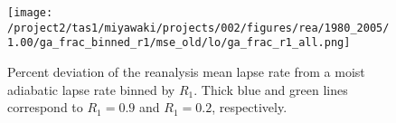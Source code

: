 \documentclass{ametsocV5}
\begin{document}




%

%

\begin{figure}
  \noindent\texttt{[image: /project2/tas1/miyawaki/projects/002/figures/rea/1980\_2005/1.00/ga\_frac\_binned\_r1/mse\_old/lo/ga\_frac\_r1\_all.png]}\\
  \caption{Percent deviation of the reanalysis mean lapse rate from a moist adiabatic lapse rate binned by $R_{1}$. Thick blue and green lines correspond to $R_1=0.9$ and $R_1=0.2$, respectively.}
  \label{fig:rea-binned-r1}
\end{figure}
\end{document}
